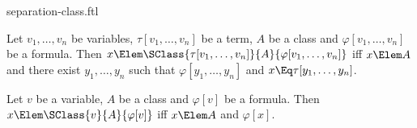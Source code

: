 \documentclass{stex}
\begin{document}
\begin{smodule}{separation-class.ftl}


\begin{fakeforthel}
  \begin{axiom}
    Let $v_1,\dots,v_n$ be variables, $\tau[v_1,\dots,v_n]$ be a term, $A$ be a class and $\varphi[v_1,\dots,v_n]$ be a formula.
    Then $x \Elem \SClass{\tau[v_1,\dots,v_n]}{A}{\varphi[v_1,\dots,v_n]}$ iff
    $x \Elem A$ and there exist $y_1,\dots,y_n$ such that $\varphi[y_1,\dots,y_n]$ and $x \Eq \tau[y_1,\dots,y_n]$.
  \end{axiom}
\end{fakeforthel}

\begin{fakeforthel}
  \begin{corollary}
    Let $v$ be a variable, $A$ be a class and $\varphi[v]$ be a formula.
    Then $x \Elem \SClass{v}{A}{\varphi[v]}$ iff $x \Elem A$ and $\varphi[x]$.
  \end{corollary}
\end{fakeforthel}

\end{smodule}
\end{document}
